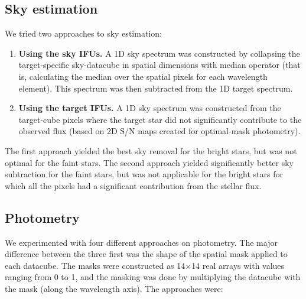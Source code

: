 \documentclass[useAMS,usenatbib]{mn2e}
\begin{document}
\subsection{Sky estimation}
\label{sec:reduction:sky_estimation}
We tried two approaches to sky estimation:
\begin{enumerate}
 \item \textbf{Using the sky IFUs.}  A 1D sky spectrum was constructed by collapsing the target-specific sky-datacube 
in spatial dimensions with median operator (that is, calculating the median over the spatial pixels for each wavelength 
  element). This spectrum was then subtracted from the 1D target spectrum.
 \item \textbf{Using the target IFUs.} A 1D sky spectrum was constructed from the target-cube pixels where the target 
    star did not significantly contribute to the observed flux (based on 2D S/N maps created for optimal-mask 
    photometry). 
\end{enumerate}
The first approach yielded the best sky removal for the bright stars, but was not optimal for the faint stars. The 
second approach yielded significantly better sky subtraction for the faint stars, but was not applicable for the bright 
stars for which all the pixels had a significant contribution from the stellar flux.

\subsection{Photometry}
\label{sec:reduction:photometry}

We experimented with four different approaches on photometry. The major difference between the three first was the 
shape of the spatial mask applied to each datacube. The masks were  constructed as 14$\times$14 real arrays with values 
ranging from 0 to 1, and the masking was done by multiplying the datacube with the mask (along the wavelength axis). 
The approaches were:
\end{document}
